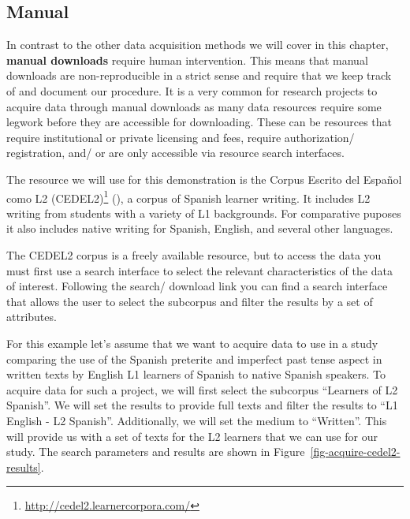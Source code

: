 \documentclass[
  letterpaper,
  krantz1]{latex/krantz-mod}
\theoremstyle{definition}
\theoremstyle{definition}
\theoremstyle{remark}
\DeclareRobustCommand{\href}[2]{#2\footnote{\url{#1}}}
\begin{document}
\subsection{Manual}\label{manual}

In contrast to the other data acquisition methods we will cover in this
chapter, \textbf{manual downloads} require human intervention. This
means that manual downloads are non-reproducible in a strict sense and
require that we keep track of and document our procedure. It is a very
common for research projects to acquire data through manual downloads as
many data resources require some legwork before they are accessible for
downloading. These can be resources that require institutional or
private licensing and fees, require authorization/ registration, and/ or
are only accessible via resource search interfaces.

The resource we will use for this demonstration is the
\href{http://cedel2.learnercorpora.com/}{Corpus Escrito del Español como
L2 (CEDEL2)} (), a corpus of
Spanish learner writing. It includes L2 writing from students with a
variety of L1 backgrounds. For comparative puposes it also includes
native writing for Spanish, English, and several other languages.

The CEDEL2 corpus is a freely available resource, but to access the data
you must first use a search interface to select the relevant
characteristics of the data of interest. Following the search/ download
link you can find a search interface that allows the user to select the
subcorpus and filter the results by a set of attributes.

For this example let's assume that we want to acquire data to use in a
study comparing the use of the Spanish preterite and imperfect past
tense aspect in written texts by English L1 learners of Spanish to
native Spanish speakers. To acquire data for such a project, we will
first select the subcorpus ``Learners of L2 Spanish''. We will set the
results to provide full texts and filter the results to ``L1 English -
L2 Spanish''. Additionally, we will set the medium to ``Written''. This
will provide us with a set of texts for the L2 learners that we can use
for our study. The search parameters and results are shown in
Figure~\ref{fig-acquire-cedel2-results}.
\end{document}
